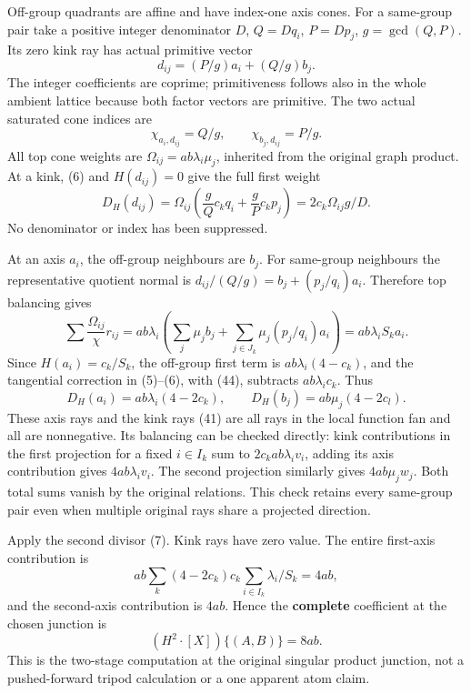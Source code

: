 \documentclass[
  11pt,
]{article}
\begin{document}
Off-group quadrants are affine and have index-one axis cones. For a
same-group pair take a positive integer denominator \(D\), \(Q=Dq_i\),
\(P=Dp_j\), \(g=\gcd(Q,P)\). Its zero kink ray has actual primitive
vector \[
                            d_{ij}=(P/g)a_i+(Q/g)b_j.        \tag{41}
\] The integer coefficients are coprime; primitiveness follows also in
the whole ambient lattice because both factor vectors are primitive. The
two actual saturated cone indices are \[
                    \chi_{a_i,d_{ij}}=Q/g,\qquad
                    \chi_{b_j,d_{ij}}=P/g.                 \tag{42}
\] All top cone weights are \(\Omega_{ij}=ab\lambda_i\mu_j\), inherited
from the original graph product. At a kink, (6) and \(H(d_{ij})=0\) give
the full first weight \[
 D_H(d_{ij})=\Omega_{ij}\left(\frac gQ c_kq_i+\frac gP c_kp_j\right)
                             =2c_k\Omega_{ij}g/D.           \tag{43}
\] No denominator or index has been suppressed.

At an axis \(a_i\), the off-group neighbours are \(b_j\). For same-group
neighbours the representative quotient normal is
\(d_{ij}/(Q/g)=b_j+(p_j/q_i)a_i\). Therefore top balancing gives \[
 \sum\frac{\Omega_{ij}}{\chi}r_{ij}
       =ab\lambda_i\left(\sum_j\mu_jb_j+
                    \sum_{j\in J_k}\mu_j(p_j/q_i)a_i\right)
       =ab\lambda_i S_k a_i.                               \tag{44}
\] Since \(H(a_i)=c_k/S_k\), the off-group first term is
\(ab\lambda_i(4-c_k)\), and the tangential correction in (5)--(6), with
(44), subtracts \(ab\lambda_i c_k\). Thus \[
 D_H(a_i)=ab\lambda_i(4-2c_k),\qquad
 D_H(b_j)=ab\mu_j(4-2c_l).                                 \tag{45}
\] These axis rays and the kink rays (41) are all rays in the local
function fan and all are nonnegative. Its balancing can be checked
directly: kink contributions in the first projection for a fixed
\(i\in I_k\) sum to \(2c_kab\lambda_i v_i\), adding its axis
contribution gives \(4ab\lambda_i v_i\). The second projection similarly
gives \(4ab\mu_jw_j\). Both total sums vanish by the original relations.
This check retains every same-group pair even when multiple original
rays share a projected direction.

Apply the second divisor (7). Kink rays have zero value. The entire
first-axis contribution is \[
 ab\sum_k(4-2c_k)c_k\sum_{i\in I_k}\lambda_i/S_k=4ab,
\] and the second-axis contribution is \(4ab\). Hence the
\textbf{complete} coefficient at the chosen junction is \[
                          (H^2\cdot[X])\{(A,B)\}=8ab.              \tag{46}
\] This is the two-stage computation at the original singular product
junction, not a pushed-forward tripod calculation or a one apparent atom
claim.
\end{document}
